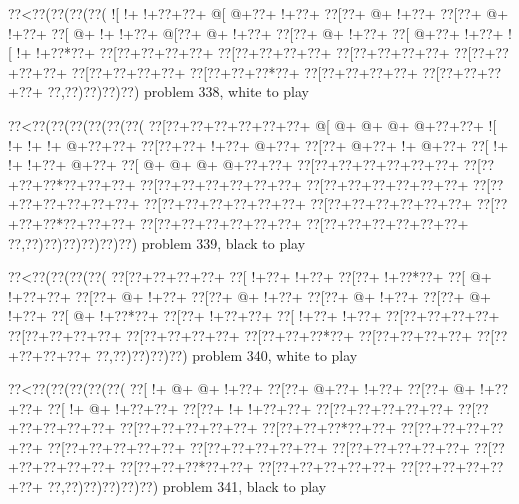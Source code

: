 \vbox{\vbox{\goo
\0??<\0??(\0??(\0??(\0??(
\- ![\- !+\- !+\0??+\0??+
\- @[\- @+\0??+\- !+\0??+
\0??[\0??+\- @+\- !+\0??+
\0??[\0??+\- @+\- !+\0??+
\0??[\- @+\- !+\- !+\0??+
\- @[\0??+\- @+\- !+\0??+
\0??[\0??+\- @+\- !+\0??+
\0??[\- @+\0??+\- !+\0??+
\- ![\- !+\- !+\0??*\0??+
\0??[\0??+\0??+\0??+\0??+
\0??[\0??+\0??+\0??+\0??+
\0??[\0??+\0??+\0??+\0??+
\0??[\0??+\0??+\0??+\0??+
\0??[\0??+\0??+\0??+\0??+
\0??[\0??+\0??+\0??*\0??+
\0??[\0??+\0??+\0??+\0??+
\0??[\0??+\0??+\0??+\0??+
\0??,\0??)\0??)\0??)\0??)
}
\hfil problem 338, white to play\hfil\break
}

\vbox{\vbox{\goo
\0??<\0??(\0??(\0??(\0??(\0??(\0??(
\0??[\0??+\0??+\0??+\0??+\0??+\0??+
\- @[\- @+\- @+\- @+\- @+\0??+\0??+
\- ![\- !+\- !+\- !+\- @+\0??+\0??+
\0??[\0??+\0??+\- !+\0??+\- @+\0??+
\0??[\0??+\- @+\0??+\- !+\- @+\0??+
\0??[\- !+\- !+\- !+\0??+\- @+\0??+
\0??[\- @+\- @+\- @+\- @+\0??+\0??+
\0??[\0??+\0??+\0??+\0??+\0??+\0??+
\0??[\0??+\0??+\0??*\0??+\0??+\0??+
\0??[\0??+\0??+\0??+\0??+\0??+\0??+
\0??[\0??+\0??+\0??+\0??+\0??+\0??+
\0??[\0??+\0??+\0??+\0??+\0??+\0??+
\0??[\0??+\0??+\0??+\0??+\0??+\0??+
\0??[\0??+\0??+\0??+\0??+\0??+\0??+
\0??[\0??+\0??+\0??*\0??+\0??+\0??+
\0??[\0??+\0??+\0??+\0??+\0??+\0??+
\0??[\0??+\0??+\0??+\0??+\0??+\0??+
\0??,\0??)\0??)\0??)\0??)\0??)\0??)
}
\hfil problem 339, black to play\hfil\break
}

\vbox{\vbox{\goo
\0??<\0??(\0??(\0??(\0??(
\0??[\0??+\0??+\0??+\0??+
\0??[\- !+\0??+\- !+\0??+
\0??[\0??+\- !+\0??*\0??+
\0??[\- @+\- !+\0??+\0??+
\0??[\0??+\- @+\- !+\0??+
\0??[\0??+\- @+\- !+\0??+
\0??[\0??+\- @+\- !+\0??+
\0??[\0??+\- @+\- !+\0??+
\0??[\- @+\- !+\0??*\0??+
\0??[\0??+\- !+\0??+\0??+
\0??[\- !+\0??+\- !+\0??+
\0??[\0??+\0??+\0??+\0??+
\0??[\0??+\0??+\0??+\0??+
\0??[\0??+\0??+\0??+\0??+
\0??[\0??+\0??+\0??*\0??+
\0??[\0??+\0??+\0??+\0??+
\0??[\0??+\0??+\0??+\0??+
\0??,\0??)\0??)\0??)\0??)
}
\hfil problem 340, white to play\hfil\break
}

\vbox{\vbox{\goo
\0??<\0??(\0??(\0??(\0??(\0??(
\0??[\- !+\- @+\- @+\- !+\0??+
\0??[\0??+\- @+\0??+\- !+\0??+
\0??[\0??+\- @+\- !+\0??+\0??+
\0??[\- !+\- @+\- !+\0??+\0??+
\0??[\0??+\- !+\- !+\0??+\0??+
\0??[\0??+\0??+\0??+\0??+\0??+
\0??[\0??+\0??+\0??+\0??+\0??+
\0??[\0??+\0??+\0??+\0??+\0??+
\0??[\0??+\0??+\0??*\0??+\0??+
\0??[\0??+\0??+\0??+\0??+\0??+
\0??[\0??+\0??+\0??+\0??+\0??+
\0??[\0??+\0??+\0??+\0??+\0??+
\0??[\0??+\0??+\0??+\0??+\0??+
\0??[\0??+\0??+\0??+\0??+\0??+
\0??[\0??+\0??+\0??*\0??+\0??+
\0??[\0??+\0??+\0??+\0??+\0??+
\0??[\0??+\0??+\0??+\0??+\0??+
\0??,\0??)\0??)\0??)\0??)\0??)
}
\hfil problem 341, black to play\hfil\break
}

